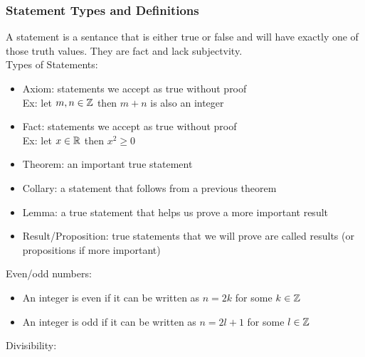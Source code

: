 \documentclass[11pt, fleqn]{article}
\begin{document}
\subsubsection{Statement Types and Definitions}
A statement is a sentance that is either true or false and will have exactly one of those truth values. They are fact and lack subjectvity.\\
Types of Statements:
\begin{itemize}
    \item Axiom: statements we accept as true without proof\\
    Ex: let $m,n\in\mathbb{Z}$ then $m+n$ is also an integer
    \item Fact: statements we accept as true without proof\\
    Ex: let $x\in\mathbb{R}$ then $x^2\geq0$
    \item Theorem: an important true statement
    \item Collary: a statement that follows from a previous theorem
    \item Lemma: a true statement that helps us prove a more important result
    \item Result/Proposition: true statements that we will prove are called results (or propositions if more important)
\end{itemize}
Even/odd numbers:
\begin{itemize}
    \item An integer is even if it can be written as $n=2k$ for some $k\in\mathbb{Z}$
    \item An integer is odd if it can be written as $n=2l+1$ for some $l\in\mathbb{Z}$
\end{itemize}
Divisibility:
\end{document}
